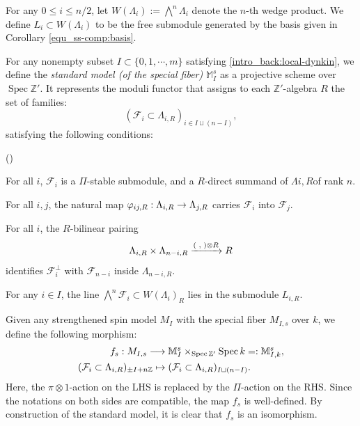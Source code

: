 \documentclass[pdflatex,sn-mathphys-num]{sn-jnl}%
\makeatletter
\theoremstyle{thmstyleone}%
\theoremstyle{thmstyletwo}%
\numberwithin{equation}{subsection}
\theoremstyle{thmstylethree}%
\newcommand{\sF}{\ensuremath{\mathscr{F}}\xspace}
\newcommand{\BM}{\ensuremath{\mathbb{M}}\xspace}
\newcommand{\BZ}{\ensuremath{\mathbb{Z}}\xspace}
\newcommand{\CF}{\ensuremath{\mathcal{F}}\xspace}
\DeclareMathOperator{\Spec}{Spec}
\newcommand{\sform}{\ensuremath{(\text{~,~})}\xspace}
\newenvironment{altenumerate}
	{\begin{list}
			{(\theenumi) }
			{\usecounter{enumi}
				\setlength{\labelwidth}{0pt}
				\setlength{\labelsep}{0pt}
				\setlength{\leftmargin}{0pt}
				\setlength{\itemsep}{\the\smallskipamount}
				\renewcommand{\theenumi}{\roman{enumi}}
		}}
		{\end{list}}
\renewcommand{\to}{%
		\ifbool{@display}{\longrightarrow}{\rightarrow}%
	}
\let\shortmapsto\mapsto
\renewcommand{\mapsto}{%
		\ifbool{@display}{\longmapsto}{\shortmapsto}%
	}
\newlength{\olen}
\newlength{\ulen}
\newlength{\xlen}
\newcommand{\xra}[2][]{%
		\ifbool{@display}%
		{\settowidth{\olen}{$\overset{#2}{\longrightarrow}$}%
			\settowidth{\ulen}{$\underset{#1}{\longrightarrow}$}%
			\settowidth{\xlen}{$\xrightarrow[#1]{#2}$}%
			\ifdimgreater{\olen}{\xlen}%
			{\underset{#1}{\overset{#2}{\longrightarrow}}}%
			{\ifdimgreater{\ulen}{\xlen}%
				{\underset{#1}{\overset{#2}{\longrightarrow}}}
				{\xrightarrow[#1]{#2}}}}%
		{\xrightarrow[#1]{#2}}
	}
\makeatother
\begin{document}
For any $0\leq i\leq n/2$, let $W(\Lambda_{i}):=\bigwedge^n\Lambda_{i}$ denote the $n$-th wedge product. We define $L_i\subset W(\Lambda_i)$ to be the free submodule generated by the basis given in Corollary \ref{equ_ss-comp:basis}.


For any nonempty subset $I\subset \{0,1,\cdots,m\}$ satisfying \eqref{intro_back:local-dynkin}, we define the \emph{standard model (of the special fiber)} $\BM^s_I$ as a projective scheme over $\Spec \BZ'$. It represents the moduli functor that assigns to each $\BZ'$-algebra $R$ the set of families:
\begin{equation*}
    (\sF_i \subset \Lambda_{i,R})_{i\in I\sqcup (n-I)},
\end{equation*}
satisfying the following conditions:
\begin{altenumerate}		
\item For all $i$, $\sF_i$ is a $\Pi$-stable submodule, and a $R$-direct summand of $\Lambda{i,R}$of rank $n$.
\item For all $i,j$, the natural map $\varphi_{ij,R}:\Lambda_{i,R} \to \Lambda_{j,R}$ carries $\sF_i$ into $\sF_j$.
\item For all $i$, the $R$-bilinear pairing
\begin{equation*}
\Lambda_{i,R} \times \Lambda_{n-i,R}
\xra{\sform \otimes R} R
\end{equation*}
identifies $\sF_i^\perp$ with $\sF_{n-i}$ inside $\Lambda_{n-i,R}$.
\item  For any $i\in I$, the line $\bigwedge^n\CF_i\subset W(\Lambda_i)_R$ lies in the submodule $L_{i,R}$.
\end{altenumerate}

Given any strengthened spin model $M_{I}$ with the special fiber $M_{I,s}$ over $k$,
we define the following morphism: 
\begin{align*}
    f_s:M_{I,s}\longrightarrow {}&\BM_I^s\times_{\Spec\BZ'}\Spec k=:\BM^s_{I,k},\\
    (\CF_i\subset \Lambda_{i,R})_{\pm I+n\BZ}\mapsto{}&(\CF_i\subset \Lambda_{i,R})_{I \sqcup (n-I)}.
\end{align*}
Here, the $\pi\otimes 1$-action on the LHS is replaced by the $\Pi$-action on the RHS. 
Since the notations on both sides are compatible, the map $f_s$ is well-defined.
By construction of the standard model, it is clear that $f_s$ is an isomorphism.
\end{document}
